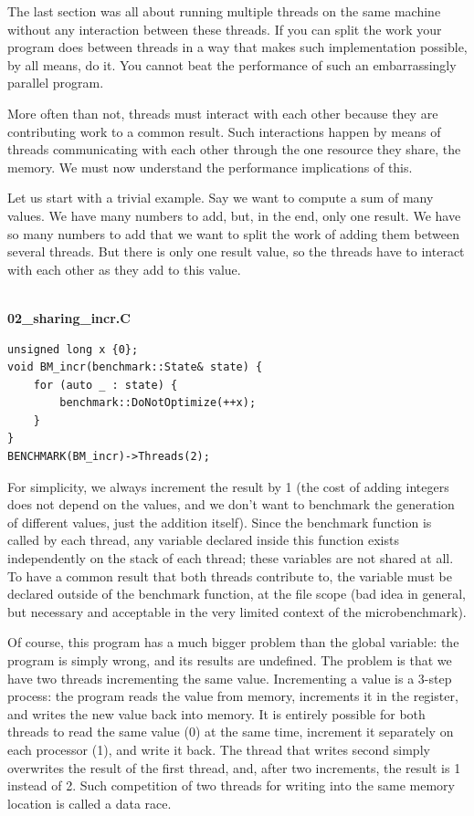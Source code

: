The last section was all about running multiple threads on the same machine without any interaction between these threads. If you can split the work your program does between threads in a way that makes such implementation possible, by all means, do it. You cannot beat the performance of such an embarrassingly parallel program.

More often than not, threads must interact with each other because they are contributing work to a common result. Such interactions happen by means of threads communicating with each other through the one resource they share, the memory. We must now understand the performance implications of this.

Let us start with a trivial example. Say we want to compute a sum of many values. We have many numbers to add, but, in the end, only one result. We have so many numbers to add that we want to split the work of adding them between several threads. But there is only one result value, so the threads have to interact with each other as they add to this value.

\hspace*{\fill} \\ %
\noindent
\textbf{02\_sharing\_incr.C}
\begin{lstlisting}[style=styleCXX]
unsigned long x {0};
void BM_incr(benchmark::State& state) {
	for (auto _ : state) {
		benchmark::DoNotOptimize(++x);
	}
}
BENCHMARK(BM_incr)->Threads(2);
\end{lstlisting}

For simplicity, we always increment the result by 1 (the cost of adding integers does not depend on the values, and we don't want to benchmark the generation of different values, just the addition itself). Since the benchmark function is called by each thread, any variable declared inside this function exists independently on the stack of each thread; these variables are not shared at all. To have a common result that both threads contribute to, the variable must be declared outside of the benchmark function, at the file scope (bad idea in general, but necessary and acceptable in the very limited context of the microbenchmark).

Of course, this program has a much bigger problem than the global variable: the program is simply wrong, and its results are undefined. The problem is that we have two threads incrementing the same value. Incrementing a value is a 3-step process: the program reads the value from memory, increments it in the register, and writes the new value back into memory. It is entirely possible for both threads to read the same value (0) at the same time, increment it separately on each processor (1), and write it back. The thread that writes second simply overwrites the result of the first thread, and, after two increments, the result is 1 instead of 2. Such competition of two threads for writing into the same memory location is called a data race. 

